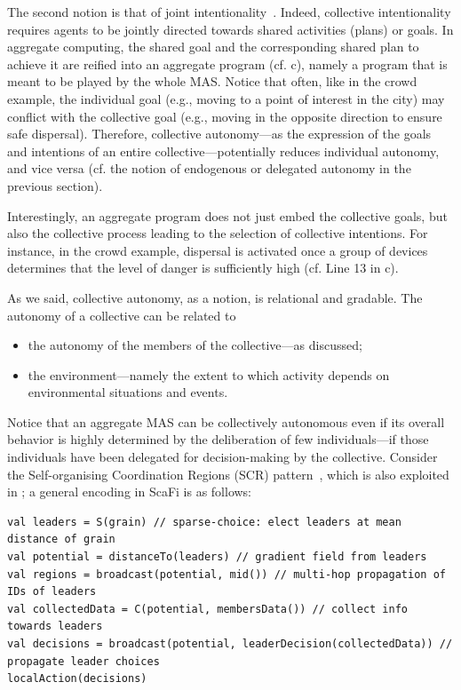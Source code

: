 \documentclass[jsan,article,accept,moreauthors,pdftex]{Definitions/mdpi}
\begin{document}
\begin{paracol}{2}
The second notion is that of {joint intentionality}~\cite{DBLP:journals/mima/Huebner15}.
%
Indeed, collective intentionality 
 requires agents to be jointly directed towards 
 shared activities (plans) or goals.
%
In aggregate computing, the shared goal 
 and the corresponding shared plan to achieve it
 are reified into an aggregate program (cf. c),
 namely a program that is  
 meant to be played by the whole MAS.
%
Notice that often, like in the crowd example,
 the individual goal (e.g., moving to a point of interest in the city)
 may conflict with the collective goal
 (e.g., moving in the opposite direction to ensure safe dispersal).
%
Therefore, collective autonomy---as the expression of the goals and intentions of an entire collective---potentially {reduces} individual autonomy, and vice versa (cf. the notion of endogenous or delegated autonomy in the previous section).

Interestingly, an aggregate program does not just embed
 the collective goals,
 but also the {collective process}
 leading to the selection of collective intentions.
%
For instance, in the crowd example,
 dispersal is activated 
 once a group of devices
 determines that the level of danger is sufficiently high
 (cf. Line 13 in c).
 
As we said,
 collective autonomy, as a notion,
 is relational and gradable.
%
The autonomy of a collective can be related to
\begin{itemize}
\item the autonomy of the members of the collective---as discussed;
\item the environment---namely the extent to which activity depends on environmental situations and events.
\end{itemize}
%

Notice that an aggregate MAS can be collectively autonomous
 even if its overall behavior
 is highly determined by the deliberation of few individuals---if those individuals have been delegated for decision-making by the collective.
%
Consider the {Self-organising Coordination Regions (SCR)} pattern~\cite{casadei2019scr}, which is also exploited in ; a general encoding in ScaFi is as follows:
\vspace{6pt}

\end{paracol}
\nointerlineskip
\begin{lstlisting}
val leaders = S(grain) // sparse-choice: elect leaders at mean distance of grain
val potential = distanceTo(leaders) // gradient field from leaders
val regions = broadcast(potential, mid()) // multi-hop propagation of IDs of leaders
val collectedData = C(potential, membersData()) // collect info towards leaders
val decisions = broadcast(potential, leaderDecision(collectedData)) // propagate leader choices
localAction(decisions)
\end{lstlisting}
\end{document}
